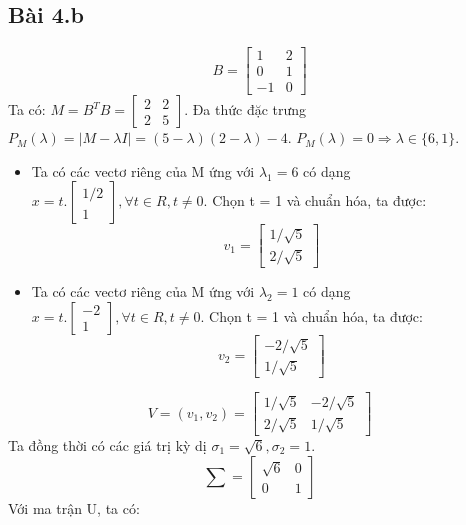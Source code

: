 \documentclass{article}
\begin{document}
\subsection*{Bài 4.b}
\[
    B = 
    \begin{bmatrix}
        1 & 2 \\ 0 & 1 \\ -1 & 0
    \end{bmatrix}
\]
Ta có: \( M = B^TB = \begin{bmatrix}
    2 & 2 \\
    2 & 5
\end{bmatrix}\). Đa thức đặc trưng \( P_M(\lambda) = |M - \lambda I| = (5- \lambda)(2 - \lambda) - 4. \) 
\newline \( P_M(\lambda) = 0 \Rightarrow \lambda \in \{ 6, 1 \}. \)
\begin{itemize}
    \item Ta có các vectơ riêng của M ứng với \( \lambda_1 = 6\) có dạng
\( x = t.\begin{bmatrix} 1/2 \\ 1 \end{bmatrix}
,\forall t \in R, t \neq 0. \) Chọn t = 1 và chuẩn hóa, ta được: 
\[ 
    v_1 = \begin{bmatrix}
        1/ \sqrt5 \\ 2 / \sqrt5
    \end{bmatrix}
\]
    \item Ta có các vectơ riêng của M ứng với \( \lambda_2 = 1\) có dạng
\( x = t.\begin{bmatrix} -2 \\ 1 \end{bmatrix}
,\forall t \in R, t \neq 0. \) Chọn t = 1 và chuẩn hóa, ta được: 
\[ 
    v_2 = \begin{bmatrix}
        -2/ \sqrt5 \\ 1 / \sqrt5
    \end{bmatrix}
\]
\end{itemize}
\[
    V = (v_1, v_2) = \begin{bmatrix}
        1/ \sqrt5 & -2/ \sqrt5 \\ 2 / \sqrt5 & 1 / \sqrt5
    \end{bmatrix}
\]
\newline Ta đồng thời có các giá trị kỳ dị \( \sigma_1 = \sqrt6 , \sigma_2 = 1 .\)  
\[
    \sum = \begin{bmatrix}
        \sqrt6 & 0 \\ 0 & 1
    \end{bmatrix}    
\]
Với ma trận U, ta có:
\end{document}
